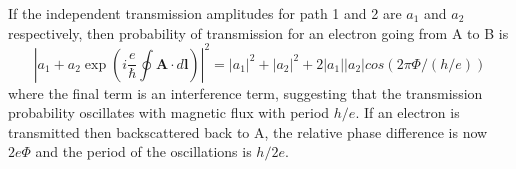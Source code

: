 \documentclass{article}
\begin{document}
If the independent transmission amplitudes for path 1 and 2 are $a_1$ and $a_2$ respectively, then probability of transmission for an electron going from A to B is
\begin{equation}
    |a_1+a_2\exp\left(i\frac{e}{\hbar}\oint\mathbf{A}\cdot d\mathbf{l}\right)|^2=|a_1|^2+|a_2|^2+2|a_1||a_2|cos(2\pi\Phi/(h/e))
\end{equation}
where the final term is an interference term, suggesting that the transmission probability oscillates with magnetic flux with period $h/e$. If an electron is transmitted then backscattered back to A, the relative phase difference is now $2e\Phi$ and the period of the oscillations is $h/2e$.
\end{document}
